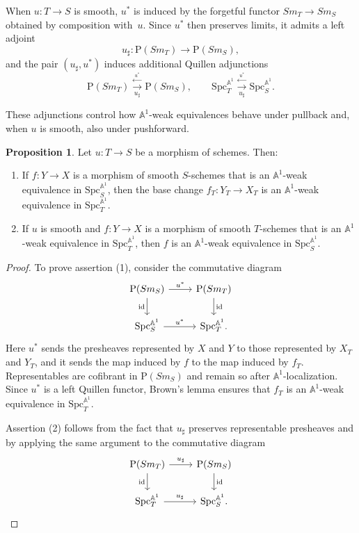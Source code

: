 \documentclass[10pt]{amsart}
\renewcommand{\AA}{\mathbb{A}}
\numberwithin{equation}{section} %
\theoremstyle{plain}
\theoremstyle{definition}
\newtheorem{prop}[prop]{Proposition}
\theoremstyle{remark}
\begin{document}
When $u:T\to S$ is smooth, $u^*$ is induced by the forgetful functor $Sm_T\to Sm_S$ obtained by composition with~$u$. Since $u^*$ then preserves limits, it admits a left adjoint
\[
u_\sharp:\mathrm{P}(Sm_T)\to  \mathrm{P}(Sm_S),
\]
and the pair $(u_\sharp,u^*)$ induces additional Quillen adjunctions
\begin{equation}
\mathrm{P}(Sm_T)
  \stackrel{\overset{u^*}{\longleftarrow}}{\underset{u_\sharp}{\rightarrow}}
\mathrm{P}(Sm_S),
\qquad
\mathrm{Spc}_T^{\AA^1}
  \stackrel{\overset{u^*}{\longleftarrow}}{\underset{u_\sharp}{\rightarrow}}
\mathrm{Spc}_S^{\AA^1}.
\end{equation}

These adjunctions control how $\AA^1$-weak equivalences behave under pullback and, when $u$ is smooth, also under pushforward.

\begin{prop}\label{cor:pushpull-A1-weak}
Let $u:T \to S$ be a morphism of schemes. Then:
\begin{enumerate}
  \item  
  If $f:Y\to X$ is a morphism of smooth $S$-schemes that is an $\AA^1$-weak equivalence in $\mathrm{Spc}_S^{\AA^1}$, then the base change
  $f_T:Y_T\to X_T$ is an $\AA^1$-weak equivalence in $\mathrm{Spc}_T^{\AA^1}$.

  \item  
  If $u$ is smooth and $f:Y\to X$ is a morphism of smooth $T$-schemes that is an $\AA^1$-weak equivalence in $\mathrm{Spc}_T^{\AA^1}$, then $f$ is an $\AA^1$-weak equivalence in $\mathrm{Spc}_S^{\AA^1}$.
\end{enumerate}
\end{prop}

\begin{proof}
To prove assertion (1), consider the commutative diagram
\[
\begin{tikzcd}
  \mathrm{P}(Sm_S) \arrow{r}{u^*} \arrow{d}[swap]{\mathrm{id}} &
  \mathrm{P}(Sm_T) \arrow{d}{\mathrm{id}} \\
  \mathrm{Spc}_S^{\AA^1} \arrow{r}{u^*} &
  \mathrm{Spc}_T^{\AA^1}.
\end{tikzcd}
\]
Here $u^*$ sends the presheaves represented by $X$ and $Y$ to those represented by $X_T$ and $Y_T$, and it sends the map induced by $f$ to the map induced by $f_T$.  
Representables are cofibrant in $\mathrm{P}(Sm_S)$ and remain so after $\AA^1$-localization.  
Since $u^*$ is a left Quillen functor, Brown’s lemma \cite[Lemma 1.1.12]{hovey2007model} ensures that $f_T$ is an $\AA^1$-weak equivalence in $\mathrm{Spc}_T^{\AA^1}$.
\medskip

Assertion (2) follows from the fact that $u_\sharp$ preserves representable presheaves and by applying the same argument to the commutative diagram
\[
\begin{tikzcd}
  \mathrm{P}(Sm_T) \arrow{r}{u_\sharp} \arrow{d}[swap]{\mathrm{id}} &
  \mathrm{P}(Sm_S) \arrow{d}{\mathrm{id}} \\
  \mathrm{Spc}_T^{\AA^1} \arrow{r}{u_\sharp} &
  \mathrm{Spc}_S^{\AA^1}.
\end{tikzcd}
\]
\end{proof}
\end{document}
